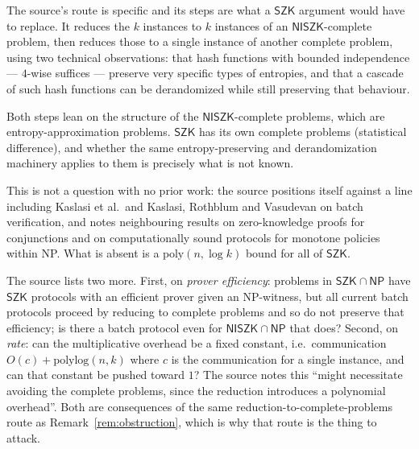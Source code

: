 \documentclass{aicr-conjecture}
\newcommand{\NISZK}{\mathsf{NISZK}}
\newcommand{\SZK}{\mathsf{SZK}}
\begin{document}
\begin{remark}\label{rem:obstruction}
The source's route is specific and its steps are what a $\SZK$ argument
would have to replace. It reduces the $k$ instances to $k$ instances of
an $\NISZK$-complete problem, then reduces those to a single instance of
another complete problem, using two technical observations: that hash
functions with bounded independence --- $4$-wise suffices --- preserve very
specific types of entropies, and that a cascade of such hash functions
can be derandomized while still preserving that behaviour.

Both steps lean on the structure of the $\NISZK$-complete problems, which
are entropy-approximation problems. $\SZK$ has its own complete problems
(statistical difference), and whether the same entropy-preserving and
derandomization machinery applies to them is precisely what is not known.
\end{remark}

\begin{remark}\label{rem:prior}
This is not a question with no prior work: the source positions itself
against a line including Kaslasi et al.\ and Kaslasi, Rothblum and
Vasudevan on batch verification, and notes neighbouring results on
zero-knowledge proofs for conjunctions and on computationally sound
protocols for monotone policies within NP\@. What is absent is a
$\mathrm{poly}(n, \log k)$ bound for all of $\SZK$.
\end{remark}

\begin{remark}\label{rem:neighbours}
The source lists two more. First, on \emph{prover efficiency}: problems in
$\SZK \cap \mathsf{NP}$ have $\SZK$ protocols with an efficient prover given an
NP-witness, but all current batch protocols proceed by reducing to
complete problems and so do not preserve that efficiency; is there a
batch protocol even for $\NISZK \cap \mathsf{NP}$ that does? Second, on \emph{rate}:
can the multiplicative overhead be a fixed constant, i.e.\ communication
$O(c) + \mathrm{polylog}(n,k)$ where $c$ is the communication for a
single instance, and can that constant be pushed toward $1$? The source
notes this ``might necessitate avoiding the complete problems, since the
reduction introduces a polynomial overhead''. Both are consequences of
the same reduction-to-complete-problems route as
Remark~\ref{rem:obstruction}, which is why that route is the thing to
attack.
\end{remark}
\end{document}
